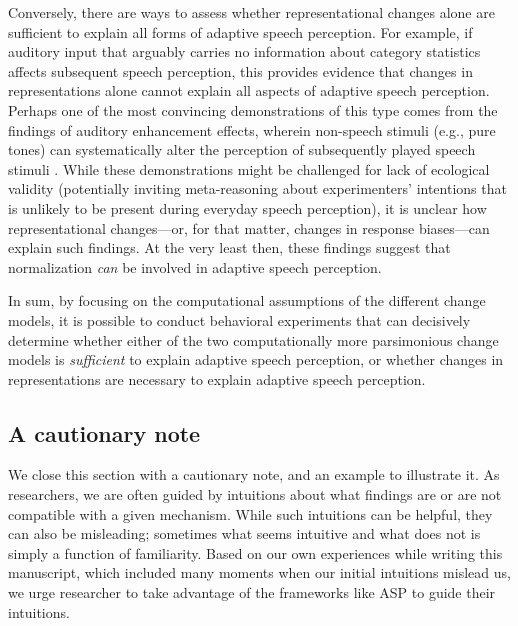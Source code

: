 \documentclass[
  11pt,
  man,floatsintext]{apa6}
\begin{document}
Conversely, there are ways to assess whether representational changes alone are sufficient to explain all forms of adaptive speech perception. For example, if auditory input that arguably carries no information about category statistics affects subsequent speech perception, this provides evidence that changes in representations alone cannot explain all aspects of adaptive speech perception. Perhaps one of the most convincing demonstrations of this type comes from the findings of auditory enhancement effects, wherein non-speech stimuli (e.g., pure tones) can systematically alter the perception of subsequently played speech stimuli \autocites{chodroff-wilson2020,holt2001,holt2005,holt2006,huang-holt2011}[for review, see also][]{weatherholtz-jaeger2016}. While these demonstrations might be challenged for lack of ecological validity (potentially inviting meta-reasoning about experimenters' intentions that is unlikely to be present during everyday speech perception), it is unclear how representational changes---or, for that matter, changes in response biases---can explain such findings. At the very least then, these findings suggest that normalization \emph{can} be involved in adaptive speech perception.

In sum, by focusing on the computational assumptions of the different change models, it is possible to conduct behavioral experiments that can decisively determine whether either of the two computationally more parsimonious change models is \emph{sufficient} to explain adaptive speech perception, or whether changes in representations are necessary to explain adaptive speech perception.

\hypertarget{a-cautionary-note}{%
\subsection{A cautionary note}\label{a-cautionary-note}}

We close this section with a cautionary note, and an example to illustrate it. As researchers, we are often guided by intuitions about what findings are or are not compatible with a given mechanism. While such intuitions can be helpful, they can also be misleading; sometimes what seems intuitive and what does not is simply a function of familiarity. Based on our own experiences while writing this manuscript, which included many moments when our initial intuitions mislead us, we urge researcher to take advantage of the frameworks like ASP to guide their intuitions.
\end{document}
